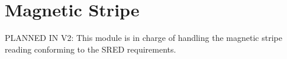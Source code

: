 \hypertarget{group__pcibx___m_s_r}{}\section{Magnetic Stripe}
\label{group__pcibx___m_s_r}
P\+L\+A\+N\+N\+ED IN V2\+: This module is in charge of handling the magnetic stripe reading conforming to the S\+R\+ED requirements. 